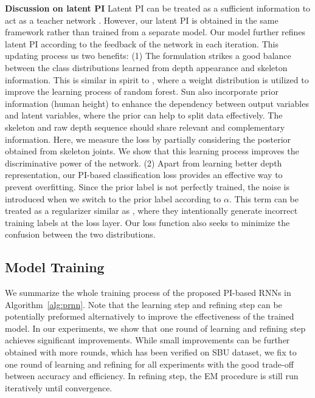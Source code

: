 \documentclass[10pt,twocolumn,letterpaper]{article}
\begin{document}
\noindent \textbf{Discussion on latent PI} Latent PI can be treated as a sufficient information to act as a teacher network \cite{Korattikara_nips_2015,Szegedy_2015}. However, our latent PI is obtained in the same framework rather than trained from a separate model. Our model further refines latent PI according to the feedback of the network in each iteration.
This updating process us two benefits: (1) The formulation strikes a good balance between the class distributions learned from depth appearance and skeleton information.  This is similar in spirit to \cite{Schulter_cvpr_2013}, where a weight distribution is utilized to improve the learning process of random forest. Sun \etal \cite{Sun_cvpr_2012} also incorporate prior information (\eg human height) to enhance the dependency between output variables and latent variables, where the prior can help to split data effectively. The skeleton and raw depth sequence should share relevant and complementary information.  Here, we measure the loss by partially considering the posterior obtained from skeleton joints. We show that this learning process improves the discriminative power of the network. (2) Apart from learning better depth representation, our PI-based classification loss provides an effective way to prevent overfitting. Since the prior label is not perfectly trained, the noise is introduced when we switch to the prior label according to $\alpha$. This term can be treated as a regularizer similar as \cite{xie2016disturblabel}, where they intentionally generate incorrect training labels at the loss layer. Our loss function also seeks to minimize the confusion between the two distributions.






\subsection{Model Training}






We summarize the whole training process of the proposed PI-based RNNs in Algorithm~\ref{alg:prnn}. Note that the learning step and refining step can be potentially preformed alternatively to improve the effectiveness of the trained model. In our experiments, we show that one round of learning and refining step achieves significant improvements. While small improvements can be further obtained with more rounds, which has been verified on SBU dataset, we fix to one round of learning and refining for all experiments with the good trade-off between accuracy and efficiency. In refining step, the EM procedure is still run iteratively until convergence.
\end{document}
